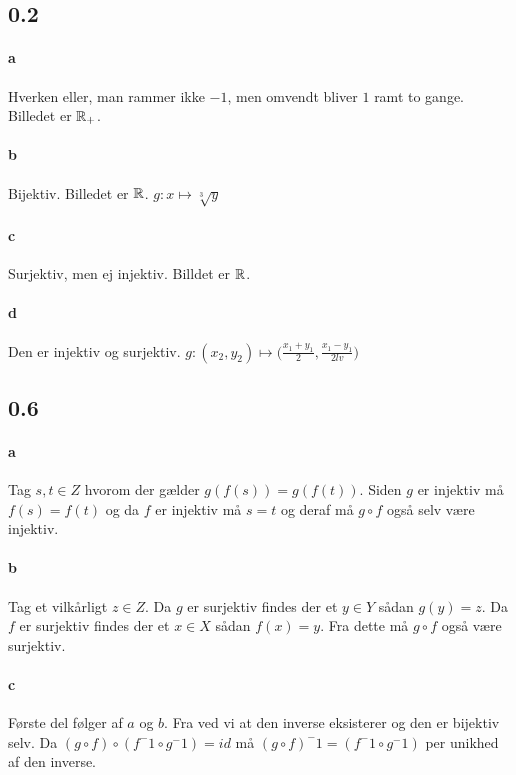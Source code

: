 		\subsection{0.2} 

			\paragraph{a} Hverken eller, man rammer ikke $-1$, men omvendt bliver $1$ ramt to gange. Billedet er $\mathbb{R}_+$.

			\paragraph{b} Bijektiv. Billedet er $\mathbb{R}$. $g:x\mapsto \sqrt[3]{y}$

			\paragraph{c} Surjektiv, men ej injektiv. Billdet er $\mathbb{R}$.

			\paragraph{d} Den er injektiv og surjektiv. $g:(x_2,y_2)\mapsto \big(\frac{x_1+y_1}{2},\frac{x_1-y_1}{2lv}\big)$

		\subsection{0.6} 

			\paragraph{a} Tag $s,t\in Z$ hvorom der gælder $g(f(s))=g(f(t))$. Siden $g$ er injektiv må $f(s)=f(t)$ og da $f$ er injektiv må $s=t$ og deraf må $g \circ f$ også selv være injektiv.

			\paragraph{b} Tag et vilkårligt $z\in Z$. Da $g$ er surjektiv findes der et $y\in Y$ sådan $g(y)=z$. Da $f$ er surjektiv findes der et $x\in X$ sådan $f(x)=y$. Fra dette må $g \circ f$ også være surjektiv.

			\paragraph{c} Første del følger af $a$ og $b$. Fra \cite[Lemma 0.1.3]{hesselholt2017} ved vi at den inverse eksisterer og den er bijektiv selv. Da $(g \circ f) \circ (f^-1 \circ g^-1)=id$ må $(g \circ f)^-1=(f^-1 \circ g^-1)$ per unikhed af den inverse.

